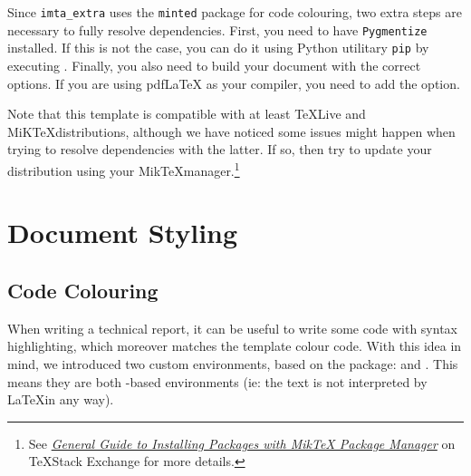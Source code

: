 \documentclass{report}
\begin{document}
Since \texttt{imta\_extra} uses the \texttt{minted} package for code colouring, two extra steps are necessary to fully resolve dependencies. First, you need to have \texttt{Pygmentize} installed. If this is not the case, you can do it using Python utilitary \texttt{pip} by executing . Finally, you also need to build your document with the correct options. If you are using pdf\LaTeX{} as your compiler, you need to add the  option.

Note that this template is compatible with at least \TeX Live and MiK\TeX distributions, although we have noticed some issues might happen when trying to resolve dependencies with the latter. If so, then try to update your distribution using your Mik\TeX manager.\footnote{See \textit{\href{https://tex.stackexchange.com/a/359851}{General Guide to Installing Packages with MikTeX Package Manager}} on \TeX Stack Exchange for more details.}


\section{Document Styling}
\subsection{Code Colouring}
When writing a technical report, it can be useful to write some code with syntax highlighting, which moreover matches the template colour code. With this idea in mind, we introduced two custom environments, based on the  package:  and . This means they are both -based environments (ie: the text is not interpreted by \LaTeX in any way).
\end{document}

